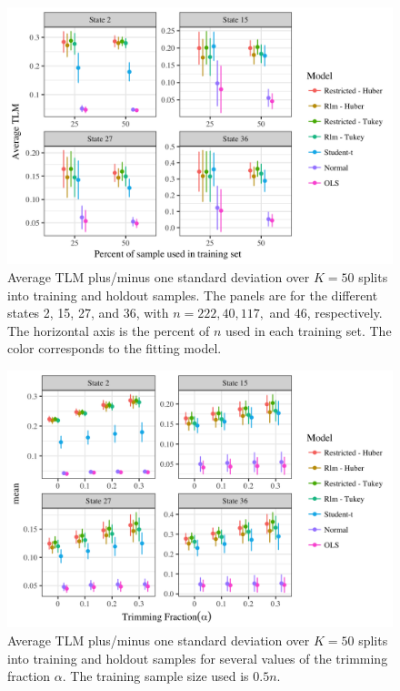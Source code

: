 \documentclass[ba]{imsart}
\begin{document}
\begin{figure}[t]
\centering
\includegraphics[width=6in]{tlm_base_Student-t.png}
\caption{Average TLM plus/minus one standard deviation over $K = 50$ splits into training and holdout samples. The panels are for the different states  2, 15, 27, and 36, with $n = 222, 40, 117,$ and $46$, respectively. The horizontal axis is the percent of $n$ used in each training set. The color corresponds to the fitting model. }
\label{fig:tlm}
\end{figure}

\begin{figure}[t]
\centering
\includegraphics[width=6in]{tlm_base_Student-tbyTrimming.png}
\caption{Average TLM plus/minus one standard deviation over $K = 50$ splits into training and holdout samples for several values of the trimming fraction $\alpha$. The training sample size used is $0.5n$.}
\label{fig:tlmbyAlpha}
\end{figure}
\end{document}
